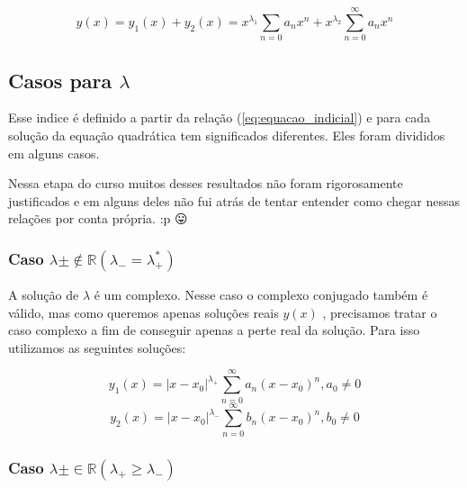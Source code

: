      \[ y(x) = y_1(x) + y_2(x) = x^{\lambda _1} \sum_{n = 0} a_n x^n + x^{\lambda _2} \sum_{n =
         0}^{\infty} a_n x^n \]
     \subsection{Casos para \( \lambda  \)}
     Esse indice é definido a partir da relação (\ref{eq:equacao_indicial}) e para cada solução da
     equação quadrática tem significados diferentes. Eles foram divididos em alguns casos.

     Nessa etapa do curso muitos desses resultados não foram rigorosamente justificados e
     em alguns deles não fui atrás de tentar entender como chegar nessas relações por
     conta própria. :p 😛
     
     \subsubsection{Caso \( \lambda  \pm \notin \mathbb{R}   ( \lambda _{-} = \lambda _{+}^{*}) \)}
     A solução de \( \lambda  \) é um complexo. Nesse caso o complexo conjugado também é válido, mas
     como queremos apenas soluções reais \( y(x) \) , precisamos tratar o caso complexo
     a fim de conseguir apenas a perte real da solução.
     Para isso utilizamos as seguintes soluções:
     
     \[ y_1 (x) = | x - x_0 |^{\lambda _+} \sum_{n = 0}^{\infty} a_n (x - x_0)^n, a_0 \neq 0 \]
     \[ y_2 (x) = | x - x_0|^{\lambda _{-}} \sum_{n = 0}^{\infty} b_n (x - x_0)^{n}, b_0 \neq 0 \]
     
     
     \subsubsection{Caso \( \lambda  \pm \in \mathbb{R} ( \lambda _+ \geq \lambda _-) \) }
     

